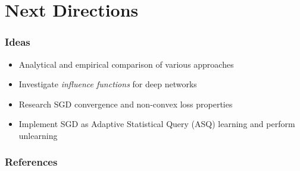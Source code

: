 \documentclass[pdf]{beamer}
\begin{document}
\section{Next Directions}
\begin{frame}
  \frametitle{Ideas}
  \begin{itemize}
    \item Analytical and empirical comparison of various approaches
    \item Investigate \textit{influence functions} for deep networks \cite{kohUnderstandingBlackboxPredictions2017,basuInfluenceFunctionsDeep2020}
    \item Research SGD convergence and non-convex loss properties \cite{liConvergenceAnalysisTwolayer2017a,liVisualizingLossLandscape2018}
    \item Implement SGD as Adaptive Statistical Query (ASQ) learning \cite{caoMakingSystemsForget2015} and perform unlearning
  \end{itemize}

  

\end{frame}

\begin{frame}[allowframebreaks]
  \frametitle{References}
  
  
\end{frame}
\end{document}
